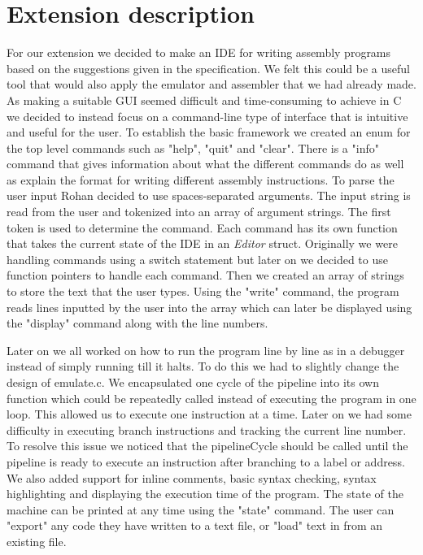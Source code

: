 \documentclass[11pt]{article}
\begin{document}
\section*{Extension description}

For our extension we decided to make an IDE for writing assembly programs based on the suggestions given in the specification. We felt this could be a useful tool that would also apply the emulator and assembler that we had already made. As making a suitable GUI seemed difficult and time-consuming to achieve in C we decided to instead focus on a command-line type of interface that is intuitive and useful for the user. To establish the basic framework we created an enum for the top level commands such as "help", "quit" and "clear". There is a "info" command that gives information about what the different commands do as well as explain the format for writing different assembly instructions. To parse the user input Rohan decided to use spaces-separated arguments. The input string is read from the user and tokenized into an array of argument strings. The first token is used to determine the command. Each command has its own function that takes the current state of the IDE in an \textit{Editor} struct. Originally we were handling commands using a switch statement but later on we decided to use function pointers to handle each command. Then we created an array of strings to store the text that the user types. Using the "write" command, the program reads lines inputted by the user into the array which can later be displayed using the "display" command along with the line numbers.

Later on we all worked on how to run the program line by line as in a debugger instead of simply running till it halts. To do this we had to slightly change the design of emulate.c. We encapsulated one cycle of the pipeline into its own function which could be repeatedly called instead of executing the program in one loop. This allowed us to execute one instruction at a time. Later on we had some difficulty in executing branch instructions and tracking the current line number. To resolve this issue we noticed that the pipelineCycle should be called until the pipeline is ready to execute an instruction after branching to a label or address. We also added support for inline comments, basic syntax checking, syntax highlighting and displaying the execution time of the program. The state of the machine can be printed at any time using the "state" command. The user can "export" any code they have written to a text file, or "load" text in from an existing file. 
\end{document}

